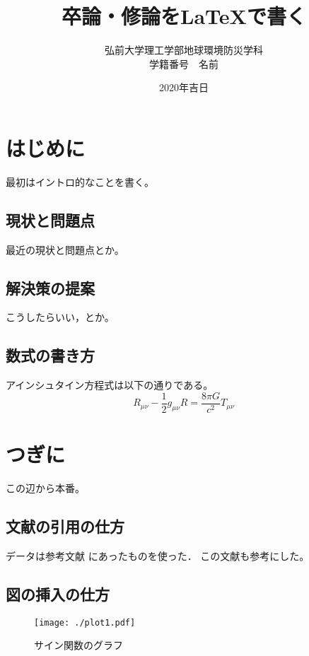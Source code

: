 \documentclass[a4paper,12pt]{jsreport}
\title{卒論・修論を\LaTeX で書く}
\author{弘前大学理工学部地球環境防災学科\\
学籍番号　名前}
\date{2020年吉日}
\begin{document}
\maketitle
\tableofcontents

\chapter{はじめに}

最初はイントロ的なことを書く。
\section{現状と問題点}

最近の現状と問題点とか。

\section{解決策の提案}

こうしたらいい，とか。

\section{数式の書き方}

アインシュタイン方程式は以下の通りである。
\begin{equation}
  R_{\mu\nu} - \frac{1}{2} g_{\mu\nu} R =
  \frac{8\pi G}{c^2} T_{\mu\nu}
\end{equation}

\chapter{つぎに}

この辺から本番。

\section{文献の引用の仕方}

データは参考文献\cite{rika} にあったものを使った．
この文献\cite{ten}も参考にした。

\section{図の挿入の仕方}
\begin{figure}[h]
  \begin{center}
    \texttt{[image: ./plot1.pdf]}
    \caption{サイン関数のグラフ}
  \end{center}
\end{figure}
\end{document}
